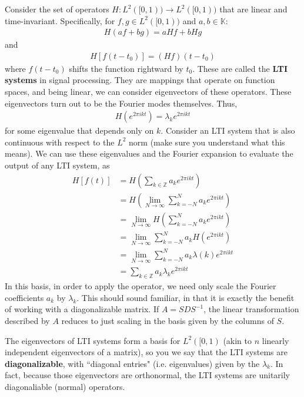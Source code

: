 \documentclass[11pt]{article}
\newcommand{\K}{\ensuremath{\mathbb K}}
\newcommand{\Z}{\ensuremath{\mathbb Z}}
\theoremstyle{plain}
\theoremstyle{definition}
\theoremstyle{remark}
\begin{document}
Consider the set of operators $H: L^2([0,1)) \rightarrow L^2([0,1))$ that are linear and time-invariant. Specifically, for $f, g \in L^2([0,1))$ and $a, b \in \K$:
\begin{align*}
    H(af + bg) = aHf + bHg
\end{align*}
and
\begin{align*}
    H[f(t-t_0)] = (Hf)(t - t_0)
\end{align*}
where $f(t - t_0)$ shifts the function rightward by $t_0$. These are called the {\bf LTI systems} in signal processing. They are mappings that operate on function spaces, and being linear, we can consider eigenvectors of these operators. These eigenvectors turn out to be the Fourier modes themselves. Thus,
\begin{align*}
    H(e^{2\pi i k t}) = \lambda_k e^{2\pi i k t}
\end{align*}
for some eigenvalue that depends only on $k$. Consider an LTI system that is also continuous with respect to the $L^2$ norm (make sure you understand what this means). We can use these eigenvalues and the Fourier expansion to evaluate the output of any LTI system, as
\begin{align*}
    H[f(t)] &= H\left(\sum_{k \in \Z} a_k e^{2\pi i k t}\right)\\
    &= H\left(\lim_{N \rightarrow \infty}\sum_{k = -N}^N a_k e^{2\pi i k t}\right)\\
    &= \lim_{N \rightarrow \infty} H\left(\sum_{k = -N}^N a_k e^{2\pi i k t}\right)\\
    &= \lim_{N \rightarrow \infty} \sum_{k = -N}^N a_k H(e^{2\pi i k t})\\
    &= \lim_{N \rightarrow \infty} \sum_{k = -N}^N a_k \lambda(k) e^{2\pi i k t}\\
    &= \sum_{k \in \Z} a_k \lambda_k e^{2\pi i k t}
\end{align*}
In this basis, in order to apply the operator, we need only scale the Fourier coefficients $a_k$ by $\lambda_k$. This should sound familiar, in that it is exactly the benefit of working with a diagonalizable matrix. If $A = SDS^{-1}$, the linear transformation described by $A$ reduces to just scaling in the basis given by the columns of $S$. 

The eigenvectors of LTI systems form a basis for $L^2([0,1)$ (akin to $n$ linearly independent eigenvectors of a matrix), so you we say that the LTI systems are {\bf diagonalizable}, with ``diagonal entries" (i.e. eigenvalues) given by the $\lambda_k$. In fact, because those eigenvectors are orthonormal, the LTI systems are unitarily diagonaliable (normal) operators.
\end{document}
